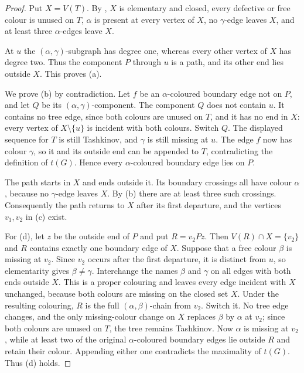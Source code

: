 \documentclass[11pt]{article}
\theoremstyle{definition}
\newcommand{\set}[1]{\{#1\}}
\newcommand{\comp}{\mathbin{\setminus}}
\begin{document}
\begin{proof}
Put $X=V(T)$. By
, $X$ is elementary and closed, every defective
or free colour is unused on $T$, $\alpha$ is present at every vertex of
$X$, no $\gamma$-edge leaves $X$, and at least three
$\alpha$-edges leave $X$.

At $u$ the $(\alpha,\gamma)$-subgraph has degree one, whereas every other
vertex of $X$ has degree two. Thus the component $P$ through $u$ is a path,
and its other end lies outside $X$. This proves (a).

We prove (b) by contradiction. Let $f$ be an $\alpha$-coloured boundary
edge not on $P$, and let $Q$ be its $(\alpha,\gamma)$-component. The
component $Q$ does not contain $u$. It contains no tree edge, since both
colours are unused on $T$, and it has no end in $X$: every vertex of
$X\comp\set{u}$ is incident with both colours. Switch $Q$. The displayed
sequence for $T$ is still Tashkinov, and $\gamma$ is still missing at $u$.
The edge $f$ now has colour $\gamma$, so it and its outside end can be
appended to $T$, contradicting the definition of $t(G)$. Hence every
$\alpha$-coloured boundary edge lies on $P$.

The path starts in $X$ and ends outside it. Its boundary crossings all have
colour $\alpha$, because no $\gamma$-edge leaves $X$. By (b) there are at
least three such crossings. Consequently the path returns to $X$ after its
first departure, and the vertices $v_1,v_2$ in (c) exist.

For (d), let $z$ be the outside end of $P$ and put $R=v_2Pz$. Then
$V(R)\cap X=\set{v_2}$ and $R$ contains exactly one boundary edge of $X$.
Suppose that a free colour $\beta$ is missing at $v_2$. Since $v_2$ occurs
after the first departure, it is distinct from $u$, so elementarity gives
$\beta\ne\gamma$. Interchange the names $\beta$ and $\gamma$ on all edges
with both ends outside $X$. This is a proper colouring and leaves every
edge incident with $X$ unchanged, because both colours are missing on the
closed set $X$. Under the resulting colouring, $R$ is the full
$(\alpha,\beta)$-chain from $v_2$. Switch it. No tree edge changes, and the
only missing-colour change on $X$ replaces $\beta$ by $\alpha$ at $v_2$;
since both colours are unused on $T$, the tree remains Tashkinov. Now
$\alpha$ is missing at $v_2$, while at least two of the original
$\alpha$-coloured boundary edges lie outside $R$ and retain their colour.
Appending either one contradicts the maximality of $t(G)$. Thus (d) holds.


\end{proof}
\end{document}
